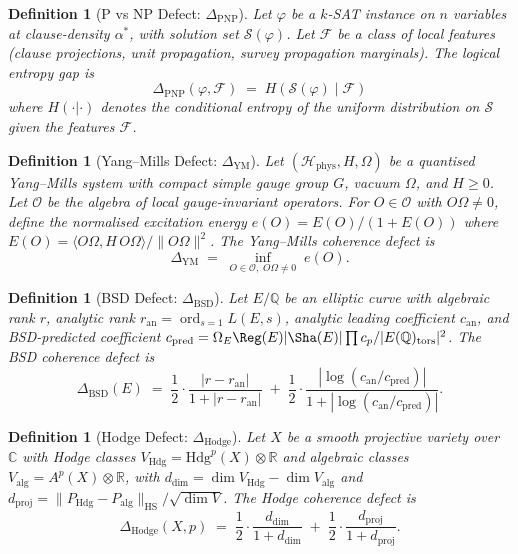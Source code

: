 \documentclass[11pt]{article}
\newtheorem{definition}[theorem]{Definition}
\DeclareMathOperator{\ord}{ord}
\begin{document}
\begin{definition}[P vs NP Defect: $\Delta_{\mathrm{PNP}}$]
\label{def:delta-pnp}
Let $\varphi$ be a $k$-SAT instance on $n$ variables at clause-density
$\alpha^*$, with solution set $\mathcal{S}(\varphi)$.
Let $\mathcal{F}$ be a class of local features (clause projections,
unit propagation, survey propagation marginals).
The \emph{logical entropy gap} is
\[
  \boxed{\Delta_{\mathrm{PNP}}(\varphi, \mathcal{F}) \;=\;
  H(\mathcal{S}(\varphi) \mid \mathcal{F})}
\]
where $H(\cdot | \cdot)$ denotes the conditional entropy of the
uniform distribution on $\mathcal{S}$ given the features $\mathcal{F}$.
\end{definition}

\begin{definition}[Yang--Mills Defect: $\Delta_{\mathrm{YM}}$]
\label{def:delta-ym}
Let $(\mathcal{H}_{\mathrm{phys}}, H, \Omega)$ be a quantised
Yang--Mills system with compact simple gauge group $G$, vacuum
$\Omega$, and $H \geq 0$.  Let $\mathcal{O}$ be the algebra
of local gauge-invariant operators.  For $O \in \mathcal{O}$
with $O\Omega \neq 0$, define the normalised excitation energy
$e(O) = E(O) / (1 + E(O))$ where
$E(O) = \langle O\Omega, H\, O\Omega \rangle / \|O\Omega\|^2$.
The \emph{Yang--Mills coherence defect} is
\[
  \boxed{\Delta_{\mathrm{YM}} \;=\;
  \inf_{O \in \mathcal{O},\; O\Omega \neq 0}\; e(O).}
\]
\end{definition}

\begin{definition}[BSD Defect: $\Delta_{\mathrm{BSD}}$]
\label{def:delta-bsd}
Let $E/\mathbb{Q}$ be an elliptic curve with algebraic rank $r$,
analytic rank $r_{\mathrm{an}} = \ord_{s=1} L(E,s)$, analytic
leading coefficient $c_{\mathrm{an}}$, and BSD-predicted coefficient
$c_{\mathrm{pred}} = \Omega_E \Reg(E) |\text{\Sha}(E)| \prod c_p
/ |E(\mathbb{Q})_{\mathrm{tors}}|^2$.
The \emph{BSD coherence defect} is
\[
  \boxed{\Delta_{\mathrm{BSD}}(E) \;=\;
  \frac{1}{2} \cdot \frac{|r - r_{\mathrm{an}}|}{1 + |r - r_{\mathrm{an}}|}
  \;+\; \frac{1}{2} \cdot
  \frac{|\log(c_{\mathrm{an}} / c_{\mathrm{pred}})|}{1 + |\log(c_{\mathrm{an}} / c_{\mathrm{pred}})|}.}
\]
\end{definition}

\begin{definition}[Hodge Defect: $\Delta_{\mathrm{Hodge}}$]
\label{def:delta-hodge}
Let $X$ be a smooth projective variety over $\mathbb{C}$ with
Hodge classes $V_{\mathrm{Hdg}} = \mathrm{Hdg}^p(X) \otimes \mathbb{R}$
and algebraic classes $V_{\mathrm{alg}} = A^p(X) \otimes \mathbb{R}$,
with $d_{\dim} = \dim V_{\mathrm{Hdg}} - \dim V_{\mathrm{alg}}$ and
$d_{\mathrm{proj}} = \|P_{\mathrm{Hdg}} - P_{\mathrm{alg}}\|_{\mathrm{HS}}
/ \sqrt{\dim V}$.
The \emph{Hodge coherence defect} is
\[
  \boxed{\Delta_{\mathrm{Hodge}}(X,p) \;=\;
  \frac{1}{2} \cdot \frac{d_{\dim}}{1 + d_{\dim}}
  \;+\; \frac{1}{2} \cdot
  \frac{d_{\mathrm{proj}}}{1 + d_{\mathrm{proj}}}.}
\]
\end{definition}
\end{document}
